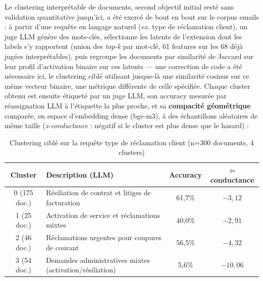 \documentclass[11pt]{article}
\begin{document}
Le clustering interprétable de documents, second objectif initial resté sans
validation quantitative jusqu'ici, a été exercé de bout en bout sur le
corpus emails : à partir d'une requête en langage naturel (\emph{ex.}
\og{}type de réclamation client\fg{}), un juge LLM génère des mots-clés,
sélectionne les latents de l'extension dont les labels s'y rapportent (union
des \emph{top-k} par mot-clé, 61 features sur les 68 déjà jugées
interprétables), puis regroupe les documents par similarité de Jaccard sur
leur profil d'activation binaire sur ces latents --- une correction de code
a été nécessaire ici, le clustering ciblé utilisant jusque-là une similarité
cosinus sur ce même vecteur binaire, une métrique différente de celle
spécifiée. Chaque cluster obtenu est ensuite étiqueté par un juge LLM, son
accuracy mesurée par réassignation LLM à l'étiquette la plus proche, et sa
\textbf{compacité géométrique} comparée, en espace d'embedding dense
(bge-m3), à des échantillons aléatoires de même taille (\emph{z-conductance} :
négatif si le cluster est plus dense que le hasard) :

\begin{table}[h!]
\centering
\caption{Clustering ciblé sur la requête \og{}type de réclamation client\fg{} (n=300 documents, 4 clusters)}
\label{tab:clustering}
\vspace{0.4em}\small
\begin{tabular}{@{}clcc@{}}
\toprule
\textbf{Cluster} & \textbf{Description (LLM)} & \textbf{Accuracy} & \textbf{$z$-conductance} \\ \midrule
0 (175 doc.) & Résiliation de contrat et litiges de facturation & 61,7\% & $-3{,}12$ \\
1 (25 doc.) & Activation de service et réclamations mixtes & 40,0\% & $-2{,}91$ \\
2 (46 doc.) & Réclamations urgentes pour coupures de courant & 56,5\% & $-4{,}32$ \\
3 (54 doc.) & Demandes administratives mixtes (activation/résiliation) & 5,6\% & $-10{,}06$ \\
\bottomrule
\end{tabular}
\end{table}
\end{document}
